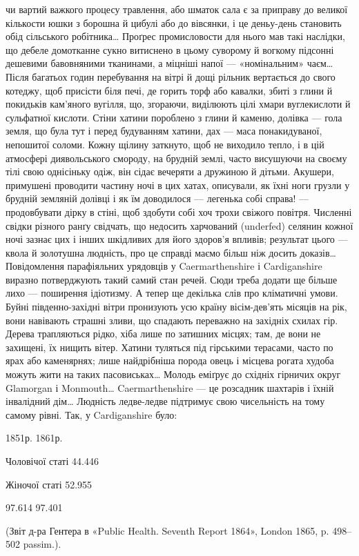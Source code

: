 чи вартий важкого процесу травлення, або шматок сала є за приправу до
великої кількости юшки з борошна й цибулі або до вівсянки, і це деньу-день
становить обід сільського робітника\dots{} Проґрес промисловости
для нього мав такі наслідки, що дебеле домотканне сукно витиснено в
цьому суворому й вогкому підсонні дешевими бавовняними тканинами,
а міцніші напої — «номінальним» чаєм\dots{} Після багатьох годин перебування
на вітрі й дощі рільник вертається до свого котеджу, щоб присісти
біля печі, де горить торф або кавалки, збиті з глини й покидьків кам’яного
вугілля, що, згораючи, виділюють цілі хмари вуглекислоти й сульфатної
кислоти. Стіни хатини пороблено з глини й каменю, долівка —
гола земля, що була тут і перед будуванням хатини, дах — маса понакидуваної,
непошитої соломи. Кожну щілину заткнуто, щоб не виходило
тепло, і в цій атмосфері диявольського смороду, на брудній землі, часто
висушуючи на своєму тілі свою однісіньку одіж, він сідає вечеряти а
дружиною й дітьми. Акушери, примушені проводити частину ночі в цих
хатах, описували, як їхні ноги грузли у брудній земляній долівці і як
їм доводилося — легенька собі справа! — продовбувати дірку в стіні, щоб
здобути собі хоч трохи свіжого повітря. Численні свідки різного ранґу
свідчать, що недосить харчований (underfed) селянин кожної ночі зазнає
цих і інших шкідливих для його здоров’я впливів; результат цього —
квола й золотушна людність, про це справді маємо більш ніж досить
доказів\dots{} Повідомлення парафіяльних урядовців у Caermarthenshire і Cardiganshire
виразно потверджують такий самий стан речей. Сюди треба
додати ще більше лихо — поширення ідіотизму. А тепер ще декілька слів
про кліматичні умови. Буйні південно-західні вітри пронизують усю
країну вісім-дев’ять місяців на рік, вони навівають страшні зливи,
що спадають переважно на західніх схилах гір. Дерева трапляються
рідко, хіба лише по затишних місцях; там, де вони не захищені, їх нищить
вітер. Хатини туляться під гірськими терасами, часто по ярах або
каменярнях; лише найдрібніша порода овець і місцева рогата худоба
можуть жити на таких пасовиськах\dots{} Молодь еміґрує до східніх гірничих
округ Glamorgan і Monmouth\dots{} Caermarthenshire — це розсадник
шахтарів і їхній інвалідний дім\dots{} Людність ледве-ледве підтримує
свою чисельність на тому самому рівні. Так, у Cardiganshire було:

                                                                               1851р.
        1861р.

Чоловічої статі                       44.446

Жіночої статі                      52.955

  97.614 97.401

(Звіт д-ра Гентера в «Public Health. Seventh Report 1864», London
1865, p. 498--502 passim.).
\parbreak{}  %
